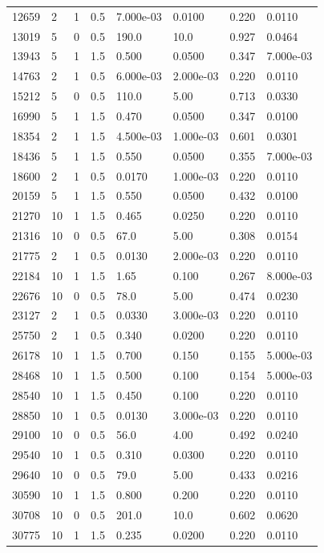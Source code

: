 \documentclass[preview]{standalone}
\begin{document}
{{\begin{tabular}{L{1.2cm}C{1.2cm} C{0.3cm}C{0.5cm} C{1.4cm}C{1.4cm} C{1.4cm}C{1.4cm}}
  12659  &     2  & 1     & 0.5 &  7.000e-03  & 0.0100  & 0.220 &  0.0110   \\ 
  13019  &     5  & 0     & 0.5 &  190.0  & 10.0  & 0.927 &  0.0464   \\ 
  13943  &     5  & 1     & 1.5 &  0.500  & 0.0500  & 0.347 &  7.000e-03   \\ 
  14763  &     2  & 1     & 0.5 &  6.000e-03  & 2.000e-03  & 0.220 &  0.0110   \\ 
  15212  &     5  & 0     & 0.5 &  110.0  & 5.00  & 0.713 &  0.0330   \\ 
  16990  &     5  & 1     & 1.5 &  0.470  & 0.0500  & 0.347 &  0.0100   \\ 
  18354  &     2  & 1     & 1.5 &  4.500e-03  & 1.000e-03  & 0.601 &  0.0301   \\ 
  18436  &     5  & 1     & 1.5 &  0.550  & 0.0500  & 0.355 &  7.000e-03   \\ 
  18600  &     2  & 1     & 0.5 &  0.0170  & 1.000e-03  & 0.220 &  0.0110   \\ 
  20159  &     5  & 1     & 1.5 &  0.550  & 0.0500  & 0.432 &  0.0100   \\ 
  21270  &    10  & 1     & 1.5 &  0.465  & 0.0250  & 0.220 &  0.0110   \\ 
  21316  &    10  & 0     & 0.5 &  67.0  & 5.00  & 0.308 &  0.0154   \\ 
  21775  &     2  & 1     & 0.5 &  0.0130  & 2.000e-03  & 0.220 &  0.0110   \\ 
  22184  &    10  & 1     & 1.5 &  1.65  & 0.100  & 0.267 &  8.000e-03   \\ 
  22676  &    10  & 0     & 0.5 &  78.0  & 5.00  & 0.474 &  0.0230   \\ 
  23127  &     2  & 1     & 0.5 &  0.0330  & 3.000e-03  & 0.220 &  0.0110   \\ 
  25750  &     2  & 1     & 0.5 &  0.340  & 0.0200  & 0.220 &  0.0110   \\ 
  26178  &    10  & 1     & 1.5 &  0.700  & 0.150  & 0.155 &  5.000e-03   \\ 
  28468  &    10  & 1     & 1.5 &  0.500  & 0.100  & 0.154 &  5.000e-03   \\ 
  28540  &    10  & 1     & 1.5 &  0.450  & 0.100  & 0.220 &  0.0110   \\ 
  28850  &    10  & 1     & 0.5 &  0.0130  & 3.000e-03  & 0.220 &  0.0110   \\ 
  29100  &    10  & 0     & 0.5 &  56.0  & 4.00  & 0.492 &  0.0240   \\ 
  29540  &    10  & 1     & 0.5 &  0.310  & 0.0300  & 0.220 &  0.0110   \\ 
  29640  &    10  & 0     & 0.5 &  79.0  & 5.00  & 0.433 &  0.0216   \\ 
  30590  &    10  & 1     & 1.5 &  0.800  & 0.200  & 0.220 &  0.0110   \\ 
  30708  &    10  & 0     & 0.5 &  201.0  & 10.0  & 0.602 &  0.0620   \\ 
  30775  &    10  & 1     & 1.5 &  0.235  & 0.0200  & 0.220 &  0.0110   \\ 
\hline 
\end{tabular} 

}}
\end{document}
